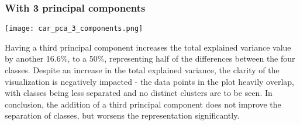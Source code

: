 \subsubsection{With 3 principal components}

\texttt{[image: car\_pca\_3\_components.png]}

Having a third principal component increases the total explained variance value
by another 16.6\%, to a 50\%, representing half of the differences between
the four classes. Despite an increase in the total explained variance, the
clarity of the visualization is negatively impacted - the data points in the
plot heavily overlap, with classes being less separated and no distinct clusters
are to be seen. In conclusion, the addition of a third principal component
does not improve the separation of classes, but worsens the representation
significantly.